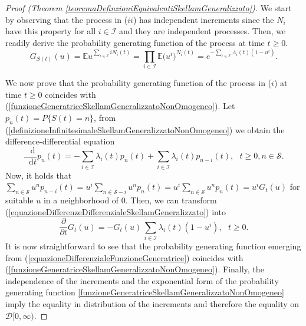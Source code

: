 \documentclass[12pt, twoside, english, headsepline]{article}
\newcommand*\dif{\mathop{}\!\mathrm{d}}  %
\theoremstyle{definition} %
\numberwithin{equation}{section} %
\begin{document}
\begin{proof}[Proof (Theorem \ref{teoremaDefinzioniEquivalentiSkellamGeneralizzato})]

We start by observing that the process in ($ii$) has independent increments since the $N_i$ have this property for all $i\in\mathcal{I}$ and they are independent processes. Then, we readily derive the probability generating function of the process at time $t\ge0$.
\begin{equation}\label{funzioneGeneratriceSkellamGeneralizzatoNonOmogeneo}
G_{S(t)}(u) = \mathbb{E} u^{\sum_{i\in\mathcal{I}} i N_i(t)} = \prod_{i\in\mathcal{I}}\mathbb{E} \bigl(u^{i}\bigr)^{N_i(t)} = e^{-\sum_{i\in\mathcal{I}} \Lambda_i(t)(1-u^i) }.
\end{equation}

We now prove that the probability generating function of the process in ($i$) at time $t\ge0$ coincides with (\ref{funzioneGeneratriceSkellamGeneralizzatoNonOmogeneo}).
Let $p_n(t) = P\{S(t) = n\}$, from (\ref{definizioneInfinitesimaleSkellamGeneralizzatoNonOmogeneo}) we obtain the difference-differential equation
\begin{equation}\label{equazioneDifferenzeDifferenzialeSkellamGeneralizzato}
\frac{\dif }{\dif t} p_n(t)= -\sum_{i\in\mathcal{I}} \lambda_i(t) p_n(t) + \sum_{i\in\mathcal{I}}\lambda_i(t) p_{n-i}(t), \ \ \ t \ge0, n\in \mathcal{S}.
\end{equation}
Now, it holds that $ \sum_{n\in \mathcal{S}}  u^n p_{n-i}(t) = u^i \sum_{n\in \mathcal{S}-i}  u^n p_{n}(t) = u^i \sum_{n\in \mathcal{S}}  u^n p_{n}(t)= u^i G_t(u) $ for suitable $u$ in a neighborhood of $0$. Then, we can transform (\ref{equazioneDifferenzeDifferenzialeSkellamGeneralizzato}) into 
\begin{equation}\label{equazioneDifferenzialeFunzioneGeneratrice}
 \frac{\partial }{\partial t} G_t(u) = -G_t(u)\,\sum_{i\in\mathcal{I}} \lambda_i(t)(1-u^i ), \ \ \ t\ge0.
\end{equation}
It is now straightforward to see that the probability generating function emerging from (\ref{equazioneDifferenzialeFunzioneGeneratrice}) coincides with  (\ref {funzioneGeneratriceSkellamGeneralizzatoNonOmogeneo}). Finally, the independence of the increments and the exponential form of the probability generating function \eqref{funzioneGeneratriceSkellamGeneralizzatoNonOmogeneo} imply the equality in distribution of the increments and therefore the equality on $\mathcal{D}[0,\infty)$.
\end{proof}
\end{document}
